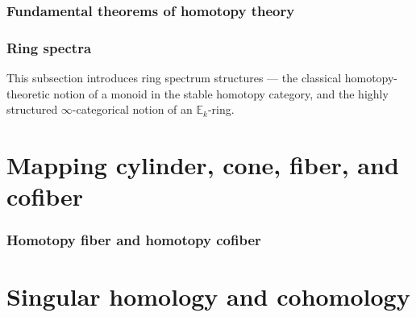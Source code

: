 


\subsubsection{Fundamental theorems of homotopy theory}







\subsubsection{Ring spectra}

This subsection introduces ring spectrum structures — the classical homotopy-theoretic notion of a monoid in the stable homotopy category, and the highly structured $\infty$-categorical notion of an $\mathbb{E}_k$-ring.





\section{Mapping cylinder, cone, fiber, and cofiber}





\subsubsection{Homotopy fiber and homotopy cofiber}






\section{Singular homology and cohomology}

